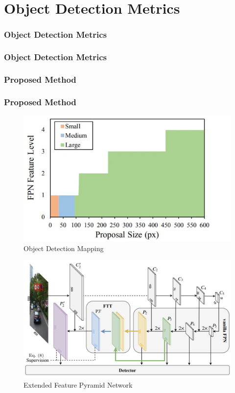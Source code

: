 \documentclass{beamer}
\begin{document}
\section{Object Detection Metrics}
\begin{frame}
  \frametitle{Object Detection Metrics}
\end{frame}

\begin{frame}
  \frametitle{Object Detection Metrics}
\end{frame}


\begin{frame}
  \frametitle{Proposed Method}
  \frametitle{Proposed Method}
  \begin{figure}[h!]
    \centering
    \includegraphics[scale=0.5]{Figures/efpn-sod-mapping.jpg}
    \caption{Object Detection Mapping}
    \label{fig:sod-problem}
  \end{figure}
\end{frame}

\begin{frame}
  \begin{figure}[h!]
    \centering
    \includegraphics[scale=0.15]{Figures/efpn.jpg}
    \caption{Extended Feature Pyramid Network}
    \label{fig:efpn}
  \end{figure}
\end{frame}
\end{document}
